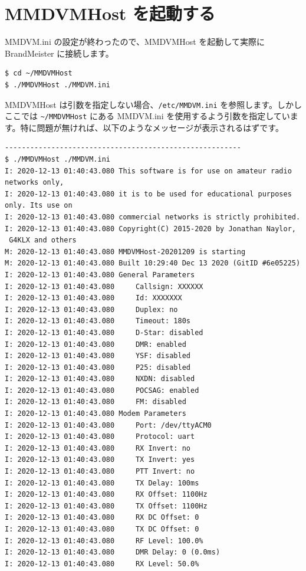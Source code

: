 \documentclass[a4j,oneside]{ujbook}
\begin{document}
\section{MMDVMHost を起動する}

MMDVM.ini の設定が終わったので、MMDVMHost を起動して実際に BrandMeister に接続します。

\begin{verbatim}
$ cd ~/MMDVMHost
$ ./MMDVMHost ./MMDVM.ini
\end{verbatim}

MMDVMHost は引数を指定しない場合、\verb+/etc/MMDVM.ini+ を参照します。しかしここでは \verb+~/MMDVMHost+ にある MMDVM.ini を使用するよう引数を指定しています。特に問題が無ければ、以下のようなメッセージが表示されるはずです。

\begin{verbatim}
--------------------------------------------------------
$ ./MMDVMHost ./MMDVM.ini
I: 2020-12-13 01:40:43.080 This software is for use on amateur radio 
networks only,
I: 2020-12-13 01:40:43.080 it is to be used for educational purposes 
only. Its use on
I: 2020-12-13 01:40:43.080 commercial networks is strictly prohibited.
I: 2020-12-13 01:40:43.080 Copyright(C) 2015-2020 by Jonathan Naylor,
 G4KLX and others
M: 2020-12-13 01:40:43.080 MMDVMHost-20201209 is starting
M: 2020-12-13 01:40:43.080 Built 10:29:40 Dec 13 2020 (GitID #6e05225)
I: 2020-12-13 01:40:43.080 General Parameters
I: 2020-12-13 01:40:43.080     Callsign: XXXXXX
I: 2020-12-13 01:40:43.080     Id: XXXXXXX
I: 2020-12-13 01:40:43.080     Duplex: no
I: 2020-12-13 01:40:43.080     Timeout: 180s
I: 2020-12-13 01:40:43.080     D-Star: disabled
I: 2020-12-13 01:40:43.080     DMR: enabled
I: 2020-12-13 01:40:43.080     YSF: disabled
I: 2020-12-13 01:40:43.080     P25: disabled
I: 2020-12-13 01:40:43.080     NXDN: disabled
I: 2020-12-13 01:40:43.080     POCSAG: enabled
I: 2020-12-13 01:40:43.080     FM: disabled
I: 2020-12-13 01:40:43.080 Modem Parameters
I: 2020-12-13 01:40:43.080     Port: /dev/ttyACM0
I: 2020-12-13 01:40:43.080     Protocol: uart
I: 2020-12-13 01:40:43.080     RX Invert: no
I: 2020-12-13 01:40:43.080     TX Invert: yes
I: 2020-12-13 01:40:43.080     PTT Invert: no
I: 2020-12-13 01:40:43.080     TX Delay: 100ms
I: 2020-12-13 01:40:43.080     RX Offset: 1100Hz
I: 2020-12-13 01:40:43.080     TX Offset: 1100Hz
I: 2020-12-13 01:40:43.080     RX DC Offset: 0
I: 2020-12-13 01:40:43.080     TX DC Offset: 0
I: 2020-12-13 01:40:43.080     RF Level: 100.0%
I: 2020-12-13 01:40:43.080     DMR Delay: 0 (0.0ms)
I: 2020-12-13 01:40:43.080     RX Level: 50.0%

\end{verbatim}
\end{document}
